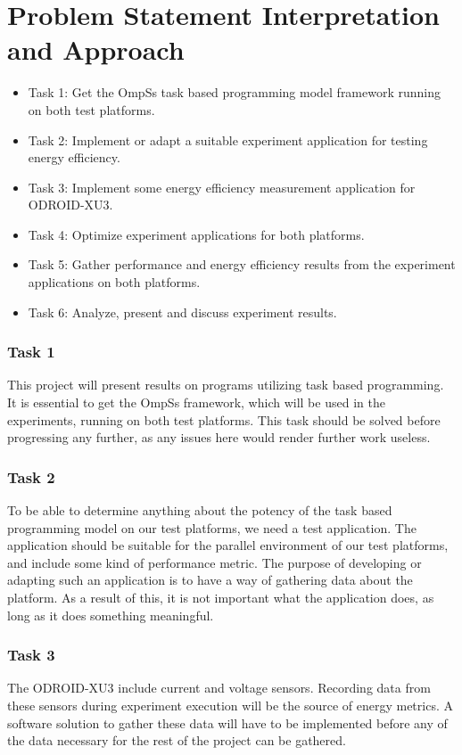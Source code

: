 \section{Problem Statement Interpretation and Approach}
\begin{itemize}
  \item Task 1: Get the OmpSs task based programming model framework running on both test platforms.
  \item Task 2: Implement or adapt a suitable experiment application for testing energy efficiency.
  \item Task 3: Implement some energy efficiency measurement application for ODROID-XU3.
  \item Task 4: Optimize experiment applications for both platforms.
  \item Task 5: Gather performance and energy efficiency results from the experiment applications on both platforms.
  \item Task 6: Analyze, present and discuss experiment results.
\end{itemize}

\subsubsection{Task 1}
This project will present results on programs utilizing task based programming.
It is essential to get the OmpSs framework, which will be used in the experiments, running on both test platforms.
This task should be solved before progressing any further, as any issues here would render further work useless.

\subsubsection{Task 2}
To be able to determine anything about the potency of the task based programming model on our test platforms, we need a test application.
The application should be suitable for the parallel environment of our test platforms, and include some kind of performance metric.
The purpose of developing or adapting such an application is to have a way of gathering data about the platform.
As a result of this, it is not important what the application does, as long as it does something meaningful.

\subsubsection{Task 3}
The ODROID-XU3 include current and voltage sensors.
Recording data from these sensors during experiment execution will be the source of energy metrics.
A software solution to gather these data will have to be implemented before any of the data necessary for the rest of the project can be gathered.

